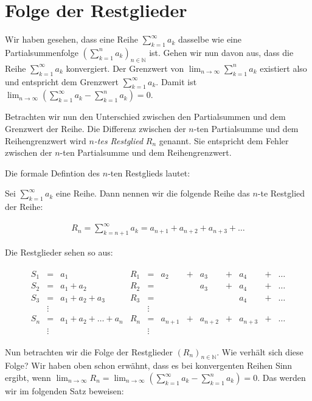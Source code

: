\documentclass[fontsize=9pt,
               parskip=half-,
               DIV=14,
               listof=chapterentry,
               tocflat]{scrbook}
\begin{document}
\section{Folge der Restglieder}

Wir haben gesehen, dass eine Reihe $\sum _{k=1}^{\infty }a_{k}$ dasselbe wie eine Partialsummenfolge $\left(\sum _{k=1}^{n}a_{k}\right)_{n\in \mathbb {N} }$ ist. Gehen wir nun davon aus, dass die Reihe $\sum _{k=1}^{\infty }a_{k}$ konvergiert. Der Grenzwert von $\lim _{n\to \infty }\sum _{k=1}^{n}a_{k}$ existiert also und entspricht dem Grenzwert $\sum _{k=1}^{\infty }a_{k}$. Damit ist $\lim _{n\to \infty }\left(\sum _{k=1}^{\infty }a_{k}-\sum _{k=1}^{n}a_{k}\right)=0$.

Betrachten wir nun den Unterschied zwischen den Partialsummen und dem Grenzwert der Reihe. Die Differenz zwischen der $n$-ten Partialsumme und dem Reihengrenzwert wird \emph{$n$-tes Restglied} $R_{n}$ genannt. Sie entspricht dem Fehler zwischen der $n$-ten Partialsumme und dem Reihengrenzwert.

Die formale Defintion des $n$-ten Restglieds lautet:

\begin{definition*}
Sei $\sum _{k=1}^{\infty }a_{k}$ eine Reihe. Dann nennen wir die folgende Reihe das $n$-te Restglied der Reihe:

\begin{align*}
R_{n}=\sum _{k=n+1}^{\infty }a_{k}=a_{n+1}+a_{n+2}+a_{n+3}+\ldots 
\end{align*}

\end{definition*}

Die Restglieder sehen so aus:

\begin{align*}
{\begin{array}{rclrcccccccc}S_{1}&=&a_{1}&R_{1}&=&a_{2}&+&a_{3}&+&a_{4}&+&\ldots \\S_{2}&=&a_{1}+a_{2}&R_{2}&=&&&a_{3}&+&a_{4}&+&\ldots \\S_{3}&=&a_{1}+a_{2}+a_{3}&R_{3}&=&&&&&a_{4}&+&\ldots \\&\vdots &&&\vdots &\\S_{n}&=&a_{1}+a_{2}+\ldots +a_{n}&R_{n}&=&a_{n+1}&+&a_{n+2}&+&a_{n+3}&+&\ldots \\&\vdots &&&\vdots &\end{array}}
\end{align*}

Nun betrachten wir die Folge der Restglieder $(R_{n})_{n\in \mathbb {N} }$. Wie verhält sich diese Folge? Wir haben oben schon erwähnt, dass es bei konvergenten Reihen Sinn ergibt, wenn $\lim _{n\to \infty }R_{n}=\lim _{n\to \infty }\left(\sum _{k=1}^{\infty }a_{k}-\sum _{k=1}^{n}a_{k}\right)=0$. Das werden wir im folgenden Satz beweisen:
\end{document}
